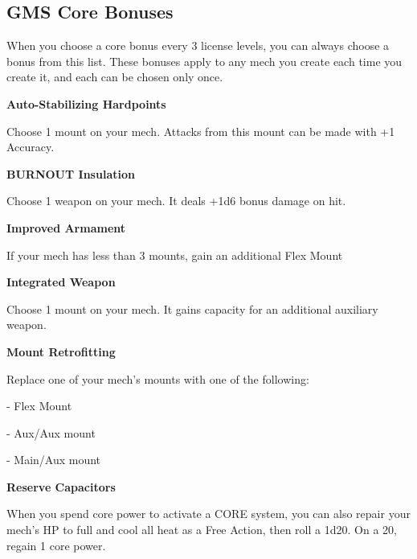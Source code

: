 \subsection{GMS Core Bonuses}
When you choose a core bonus every 3 license levels, you can always choose a bonus from this list. These bonuses apply to any mech you create each time you create it, and each can be chosen only once.


\textbf{Auto-Stabilizing Hardpoints}

Choose 1 mount on your mech. Attacks from this mount can be made with +1 Accuracy.


\textbf{BURNOUT Insulation}

Choose 1 weapon on your mech. It deals +1d6 bonus damage on hit.


\textbf{Improved Armament}

If your mech has less than 3 mounts, gain an additional Flex Mount


\textbf{Integrated Weapon}

Choose 1 mount on your mech. It gains capacity for an additional auxiliary weapon.


\textbf{Mount Retrofitting}

Replace one of your mech's mounts with one of the following:

	       - Flex Mount

	       - Aux/Aux mount

	       - Main/Aux mount


\textbf{Reserve Capacitors}

When you spend core power to activate a CORE system, you can also repair your mech's HP to full and cool all heat as a Free Action, then roll a 1d20. On a 20, regain 1 core power.

